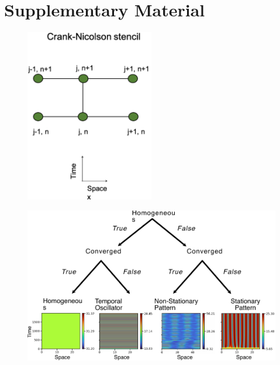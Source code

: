 \section*{Supplementary Material}
\begin{figure}[!h]
    \includegraphics[width=0.5\textwidth]{figures/stencils}

    \caption{}
    \label{sup_fig1}
\end{figure}


\begin{figure}[!h]
    \includegraphics[width=1\textwidth]{figures/no_growth_classification}

    \caption{}
    \label{sup_fig2}
\end{figure}


